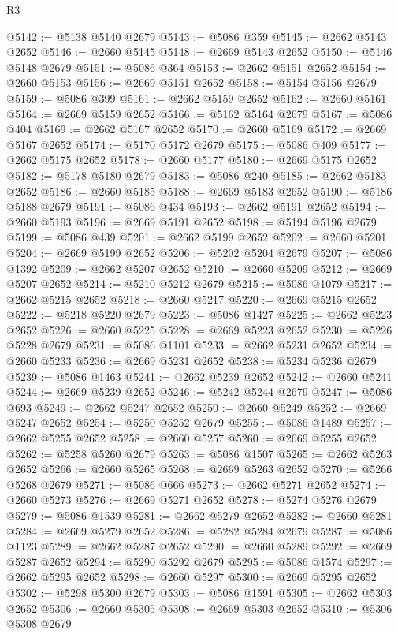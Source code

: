\begin{lexlean}{R3}
\begin{coremodule}
@5142 := @5138 @5140 @2679
@5143 := @5086 @359
@5145 := @2662 @5143 @2652
@5146 := @2660 @5145
@5148 := @2669 @5143 @2652
@5150 := @5146 @5148 @2679
@5151 := @5086 @364
@5153 := @2662 @5151 @2652
@5154 := @2660 @5153
@5156 := @2669 @5151 @2652
@5158 := @5154 @5156 @2679
@5159 := @5086 @399
@5161 := @2662 @5159 @2652
@5162 := @2660 @5161
@5164 := @2669 @5159 @2652
@5166 := @5162 @5164 @2679
@5167 := @5086 @404
@5169 := @2662 @5167 @2652
@5170 := @2660 @5169
@5172 := @2669 @5167 @2652
@5174 := @5170 @5172 @2679
@5175 := @5086 @409
@5177 := @2662 @5175 @2652
@5178 := @2660 @5177
@5180 := @2669 @5175 @2652
@5182 := @5178 @5180 @2679
@5183 := @5086 @240
@5185 := @2662 @5183 @2652
@5186 := @2660 @5185
@5188 := @2669 @5183 @2652
@5190 := @5186 @5188 @2679
@5191 := @5086 @434
@5193 := @2662 @5191 @2652
@5194 := @2660 @5193
@5196 := @2669 @5191 @2652
@5198 := @5194 @5196 @2679
@5199 := @5086 @439
@5201 := @2662 @5199 @2652
@5202 := @2660 @5201
@5204 := @2669 @5199 @2652
@5206 := @5202 @5204 @2679
@5207 := @5086 @1392
@5209 := @2662 @5207 @2652
@5210 := @2660 @5209
@5212 := @2669 @5207 @2652
@5214 := @5210 @5212 @2679
@5215 := @5086 @1079
@5217 := @2662 @5215 @2652
@5218 := @2660 @5217
@5220 := @2669 @5215 @2652
@5222 := @5218 @5220 @2679
@5223 := @5086 @1427
@5225 := @2662 @5223 @2652
@5226 := @2660 @5225
@5228 := @2669 @5223 @2652
@5230 := @5226 @5228 @2679
@5231 := @5086 @1101
@5233 := @2662 @5231 @2652
@5234 := @2660 @5233
@5236 := @2669 @5231 @2652
@5238 := @5234 @5236 @2679
@5239 := @5086 @1463
@5241 := @2662 @5239 @2652
@5242 := @2660 @5241
@5244 := @2669 @5239 @2652
@5246 := @5242 @5244 @2679
@5247 := @5086 @693
@5249 := @2662 @5247 @2652
@5250 := @2660 @5249
@5252 := @2669 @5247 @2652
@5254 := @5250 @5252 @2679
@5255 := @5086 @1489
@5257 := @2662 @5255 @2652
@5258 := @2660 @5257
@5260 := @2669 @5255 @2652
@5262 := @5258 @5260 @2679
@5263 := @5086 @1507
@5265 := @2662 @5263 @2652
@5266 := @2660 @5265
@5268 := @2669 @5263 @2652
@5270 := @5266 @5268 @2679
@5271 := @5086 @666
@5273 := @2662 @5271 @2652
@5274 := @2660 @5273
@5276 := @2669 @5271 @2652
@5278 := @5274 @5276 @2679
@5279 := @5086 @1539
@5281 := @2662 @5279 @2652
@5282 := @2660 @5281
@5284 := @2669 @5279 @2652
@5286 := @5282 @5284 @2679
@5287 := @5086 @1123
@5289 := @2662 @5287 @2652
@5290 := @2660 @5289
@5292 := @2669 @5287 @2652
@5294 := @5290 @5292 @2679
@5295 := @5086 @1574
@5297 := @2662 @5295 @2652
@5298 := @2660 @5297
@5300 := @2669 @5295 @2652
@5302 := @5298 @5300 @2679
@5303 := @5086 @1591
@5305 := @2662 @5303 @2652
@5306 := @2660 @5305
@5308 := @2669 @5303 @2652
@5310 := @5306 @5308 @2679

\end{coremodule}
\end{lexlean}
